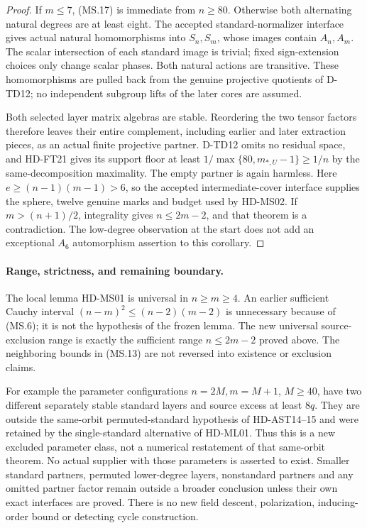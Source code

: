 \begin{proof}
If $m\le7$, (MS.17) is immediate from $n\ge80$.
Otherwise both alternating natural degrees are at least eight.
The accepted standard-normalizer interface gives actual natural
homomorphisms into $S_n,S_m$, whose images contain $A_n,A_m$.
The scalar intersection of each standard image is trivial;
fixed sign-extension choices only change scalar phases.
Both natural actions are transitive. These homomorphisms are
pulled back from the genuine projective quotients of D-TD12;
no independent subgroup lifts of the later cores are assumed.

Both selected layer matrix algebras are stable. Reordering the
two tensor factors therefore leaves their entire complement,
including earlier and later extraction pieces, as an actual
finite projective partner. D-TD12 omits no residual space, and
HD-FT21 gives its support floor at least
$1/\max\{80,m_{*,U}-1\}\ge1/n$ by the same-decomposition
maximality. The empty partner is again harmless.
Here $e\ge(n-1)(m-1)>6$, so the accepted intermediate-cover
interface supplies the sphere, twelve genuine marks and budget
used by HD-MS02. If $m>(n+1)/2$, integrality gives
$n\le2m-2$, and that theorem is a contradiction.
The low-degree observation at the start does not add an
exceptional $A_6$ automorphism assertion to this corollary.
\end{proof}

\paragraph{Range, strictness, and remaining boundary.}
The local lemma HD-MS01 is universal in $n\ge m\ge4$.
An earlier sufficient Cauchy interval
$(n-m)^2\le(n-2)(m-2)$ is unnecessary because of (MS.6);
it is not the hypothesis of the frozen lemma. The new universal
source-exclusion range is exactly the sufficient range
$n\le2m-2$ proved above. The neighboring bounds in (MS.13)
are not reversed into existence or exclusion claims.

For example the parameter configurations $n=2M,m=M+1$,
$M\ge40$, have two different separately stable standard layers
and source excess at least $8q$. They are outside the same-orbit
permuted-standard hypothesis of HD-AST14--15 and were retained
by the single-standard alternative of HD-ML01. Thus this is a
new excluded parameter class, not a numerical restatement of
that same-orbit theorem. No actual supplier with those parameters
is asserted to exist. Smaller standard partners, permuted
lower-degree layers, nonstandard partners and any omitted
partner factor remain outside a broader conclusion unless their
own exact interfaces are proved. There is no new field descent,
polarization, inducing-order bound or detecting cycle construction.
